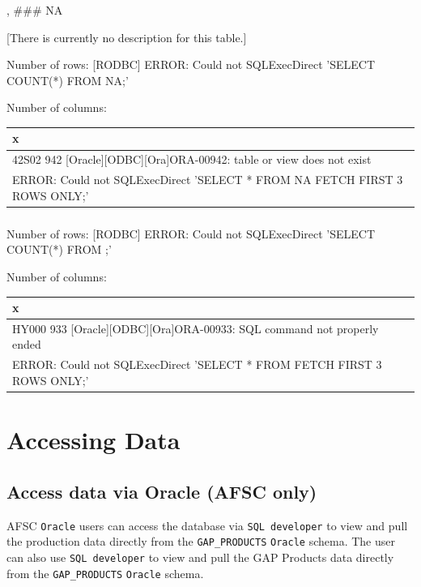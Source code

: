 \documentclass[
  letterpaper,
  oneside,
  open=any]{scrbook}
\begin{document}
, \#\#\# NA

{[}There is currently no description for this table.{]}

Number of rows: {[}RODBC{]} ERROR: Could not SQLExecDirect 'SELECT
COUNT(*) FROM NA;'

Number of columns:

\begin{tabular}{l}
\hline
x\\
\hline
42S02 942 [Oracle][ODBC][Ora]ORA-00942: table or view does not exist\\
\hline
[RODBC] ERROR: Could not SQLExecDirect 'SELECT *
    FROM NA
    FETCH FIRST 3 ROWS ONLY;'\\
\hline
\end{tabular}

\hypertarget{section-305}{%
\subsection{}\label{section-305}}

Number of rows: {[}RODBC{]} ERROR: Could not SQLExecDirect 'SELECT
COUNT(*) FROM ;'

Number of columns:

\begin{tabular}{l}
\hline
x\\
\hline
HY000 933 [Oracle][ODBC][Ora]ORA-00933: SQL command not properly ended\\
\hline
[RODBC] ERROR: Could not SQLExecDirect 'SELECT *
    FROM 
    FETCH FIRST 3 ROWS ONLY;'\\
\hline
\end{tabular}

\hypertarget{accessing-data}{%
\chapter{Accessing Data}\label{accessing-data}}

\hypertarget{access-data-via-oracle-afsc-only}{%
\section{Access data via Oracle (AFSC
only)}\label{access-data-via-oracle-afsc-only}}

AFSC \texttt{Oracle} users can access the database via
\texttt{SQL\ developer} to view and pull the production data directly
from the \texttt{GAP\_PRODUCTS} \texttt{Oracle} schema. The user can
also use \texttt{SQL\ developer} to view and pull the GAP Products data
directly from the \texttt{GAP\_PRODUCTS} \texttt{Oracle} schema.
\end{document}
